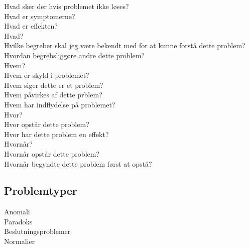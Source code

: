     Hvad sker der hvis problemet ikke løses?\\
    Hvad er symptomerne? \\
    Hvad er effekten? \\
    
    
    Hvad?\\
    Hvilke begreber skal jeg være bekendt med for at kunne forstå dette problem?\\
    Hvordan begrebsliggøre andre dette problem?\\
    
    Hvem?\\
    Hvem er skyld i problemet?\\
    Hvem siger dette er et problem?\\
    Hvem påvirkes af dette prblem?\\
    Hvem har indflydelse på problemet?\\
    
    Hvor?\\
    Hvor opstår dette problem?\\
    Hvor har dette problem en effekt?\\
    
    Hvornår?\\
    Hvornår opstår dette problem?\\
    Hvornår begyndte dette problem først at opstå?\\
    
    \subsection{Problemtyper}
    Anomali\\
    Paradoks\\
    Beslutningsproblemer\\
    Normalier\\
